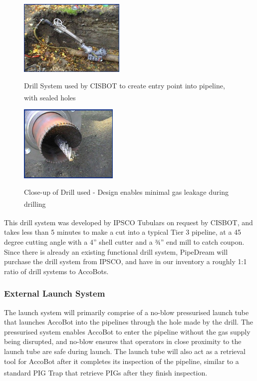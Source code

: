 \documentclass[11pt]{article}		%
\newcommand{\supercite}[1]{\textsuperscript{\cite{#1}}}		%
\begin{document}
				\begin{figure}[h]
				\centering
				\begin{multicols}{2}
				    \includegraphics[width = 0.45\textwidth]{drill1.jpg}
    				\caption{Drill System used by CISBOT to create entry point into pipeline, with sealed holes\supercite{drill1} }
    				\label{drill1}
    				\columnbreak
    				\includegraphics[width = 0.42\textwidth]{drill2.jpg}
    				\caption{Close-up of Drill used - Design enables minimal gas leakage during drilling\supercite{drill2}}
    				\label{drill2}
				\end{multicols}
			\end{figure}
		This drill system was developed by IPSCO Tubulars on request by CISBOT\supercite{IPSCO}, and takes less than 5 minutes to make a cut into a typical Tier 3 pipeline, at a 45 degree cutting angle with a 4” shell cutter and a ¾” end mill to catch coupon.
        \\ \hspace*{3ex}Since there is already an existing functional drill system, PipeDream will purchase the drill system from IPSCO, and have in our inventory a roughly 1:1 ratio of drill systems to AccoBots. 
		\subsubsection{External Launch System}
	    The launch system will primarily comprise of a no-blow pressurised launch tube that launches AccoBot into the pipelines through the hole made by the drill. The pressurised system enables AccoBot to enter the pipeline without the gas supply being disrupted, and no-blow ensures that operators in close proximity to the launch tube are safe during launch. The launch tube will also act as a retrieval tool for AccoBot after it completes its inspection of the pipeline, similar to a standard PIG Trap that retrieve PIGs after they finish inspection\supercite{pigTrap}. 
\end{document}
